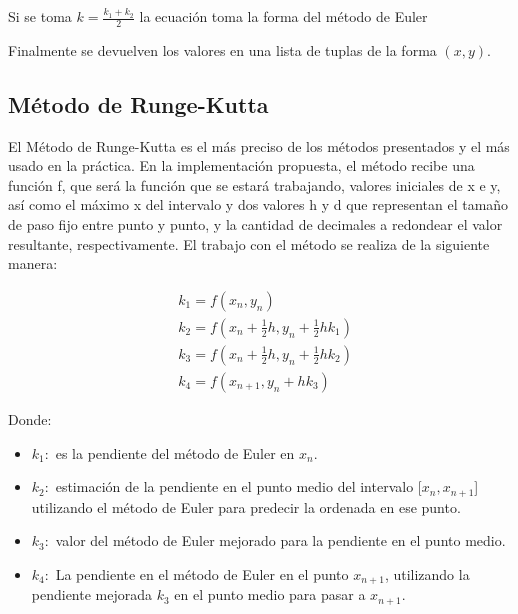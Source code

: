 \documentclass[a4paper.10pt]{article}
\begin{document}
Si se toma $k=\frac{k_1+k_2}{2}$ la ecuaci\'on toma la forma del m\'etodo de Euler

Finalmente se devuelven los valores en una lista de tuplas de la forma $(x,y)$.



\subsection{M\'etodo de Runge-Kutta}

El M\'etodo de Runge-Kutta es el m\'as preciso de los m\'etodos presentados y el m\'as usado en la pr\'actica. En la implementaci\'on propuesta, el m\'etodo recibe una funci\'on f, que ser\'a la funci\'on que se estar\'a trabajando, valores iniciales de x e y, as\'i como el m\'aximo x del intervalo y dos valores h y d que representan el tama\~no de paso fijo entre punto y punto, y la cantidad de decimales a redondear el valor resultante, respectivamente.
El trabajo con el m\'etodo se realiza de la siguiente manera:

\begin{equation*}
    \begin{aligned}
         & k_1=f(x_n,y_n)                               \\
         & k_2=f(x_n+\frac{1}{2}h, y_n+\frac{1}{2}hk_1) \\
         & k_3=f(x_n+\frac{1}{2}h, y_n+\frac{1}{2}hk_2) \\
         & k_4=f(x_{n+1},y_n+hk_3)
    \end{aligned}
\end{equation*}


Donde:
\begin{itemize}
    \item $k_1:$ es la pendiente del m\'etodo de Euler en $x_n$. \\
    \item $k_2:$ estimaci\'on de la pendiente en el punto medio del intervalo [$x_n,x_{n+1}$] utilizando el m\'etodo de Euler para predecir la ordenada en ese punto. \\
    \item $k_3:$ valor del m\'etodo de Euler mejorado para la pendiente en el punto medio. \\
    \item $k_4:$ La pendiente en el m\'etodo de Euler en el punto $x_{n+1}$, utilizando la pendiente mejorada $k_3$ en el punto medio para pasar a $x_{n+1}$.
\end{itemize}
\end{document}
